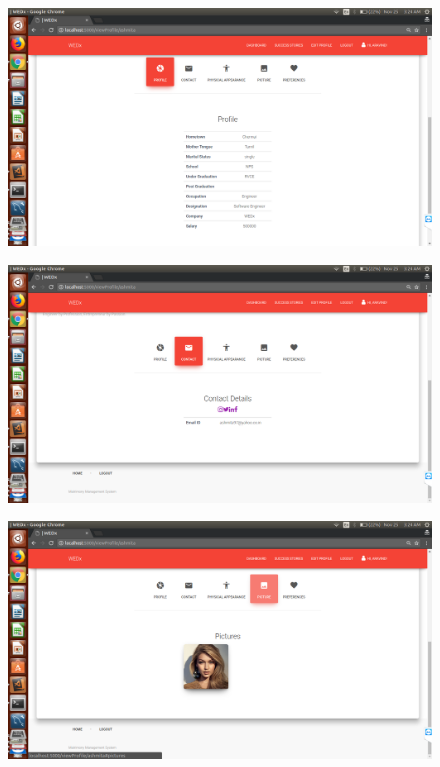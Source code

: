 \documentclass[12pt]{report}
\begin{document}
\begin{figure}[!htb]
    \centering
    \includegraphics[width=1\textwidth]{sc-12.png}
\end{figure}

\begin{figure}[!htb]
    \centering
    \includegraphics[width=1\textwidth]{sc-13.png}
\end{figure}

\begin{figure}[!htb]
    \centering
    \includegraphics[width=1\textwidth]{sc-14.png}
\end{figure}
\end{document}
